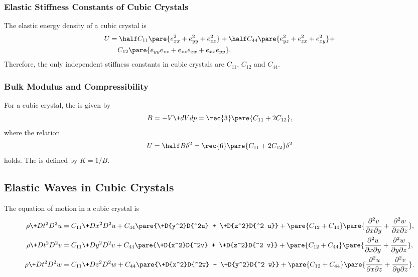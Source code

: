 \documentclass[hidelinks]{article}
\begin{document}
\subsubsection{Elastic Stiffness Constants of Cubic Crystals} %
\label{ssub:elastic_stiffness_constants_of_cubic_crystals}

The elastic energy density of a cubic crystal is
\begin{align*}
    U &= \half C_{11} \pare{e_{xx}^2 + e_{yy}^2 + e_{zz}^2} + \half C_{44}\pare{e_{yz}^2 + e_{zx}^2 + e_{xy}^2} + \\
    &\phantom{=\ } C_{12} \pare{e_{yy}e_{zz} + e_{zz}e_{xx} + e_{xx}e_{yy}}.
\end{align*}
Therefore, the only independent stiffness constants in cubic crystals are $C_{11}$, $C_{12}$ and $C_{44}$.


\subsubsection{Bulk Modulus and Compressibility} %
\label{ssub:bulk_modulus_and_compressibility}

For a cubic crystal, the  is given by
\[ B = -V\+dVdp = \rec{3}\pare{C_{11} + 2C_{12}}, \]
where the relation
\[ U = \half B\delta^2 = \rec{6}\pare{C_{11} + 2C_{12}}\delta^2 \]
holds. The  is defined by $K = 1/B$.



\subsection{Elastic Waves in Cubic Crystals} %
\label{sub:elastic_waves_in_cubic_crystals}

The equation of motion in a cubic crystal is
\begin{align}
    \label{eq:motion_u}
    \rho \+D{t^2}D{^2 u} &= C_{11} \+D{x^2}D{^2 u} + C_{44}\pare{\+D{y^2}D{^2u} + \+D{z^2}D{^2 u}} + \pare{C_{12} + C_{44}} \pare{\frac{\partial^2 v}{\partial x\partial y} + \frac{\partial^2 w}{\partial x \partial z}}, \\
    \label{eq:motion_v}
    \rho \+D{t^2}D{^2 v} &= C_{11} \+D{y^2}D{^2 v} + C_{44}\pare{\+D{x^2}D{^2v} + \+D{z^2}D{^2 v}} + \pare{C_{12} + C_{44}} \pare{\frac{\partial^2 u}{\partial x\partial y} + \frac{\partial^2 w}{\partial y \partial z}}, \\
    \label{eq:motion_w}
    \rho \+D{t^2}D{^2 w} &= C_{11} \+D{z^2}D{^2 w} + C_{44}\pare{\+D{x^2}D{^2w} + \+D{y^2}D{^2 w}} + \pare{C_{12} + C_{44}} \pare{\frac{\partial^2 u}{\partial x\partial z} + \frac{\partial^2 v}{\partial y \partial z}}.
\end{align}
\end{document}
